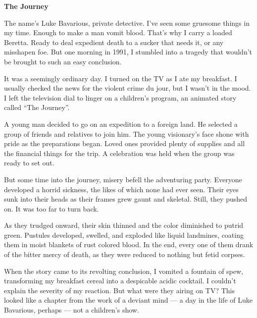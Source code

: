  





{\bf The Journey}



The name's Luke Bavarious, private detective. I've seen
some gruesome things in my time. Enough to make a man vomit blood.
That's why I carry a loaded Beretta. Ready to deal expedient
death to a sucker that needs it, or any misshapen foe. But one
morning in 1991, I stumbled into a tragedy that wouldn't be
brought to such an easy conclusion.



It was a seemingly ordinary day. I turned on the TV as I ate my
breakfast. I usually checked the news for the violent crime du
jour, but I wasn't in the mood. I left the television dial to
linger on a children's program, an animated story called
``The Journey''.



A young man decided to go on an expedition to a foreign land. He
selected a group of friends and relatives to join him. The young
visionary's face shone with pride as the preparations began.
Loved ones provided plenty of supplies and all the financial things
for the trip. A celebration was held when the group was ready to
set out.



But some time into the journey, misery befell the adventuring
party. Everyone developed a horrid sickness, the likes of which
none had ever seen. Their eyes sunk into their heads as their
frames grew gaunt and skeletal. Still, they pushed on. It was too
far to turn back.



As they trudged onward, their skin thinned and the color diminished
to putrid green. Pustules developed, swelled, and exploded like
liquid landmines, coating them in moist blankets of rust colored
blood. In the end, every one of them drank of the bitter mercy of
death, as they were reduced to nothing but fetid corpses.



When the story came to its revolting conclusion, I vomited a
fountain of spew, transforming my breakfast cereal into a
despicable acidic cocktail. I couldn't explain the severity
of my reaction. But what were they airing on TV? This looked like a
chapter from the work of a deviant mind --- a day in the life
of Luke Bavarious, perhaps --- not a children's
show.



